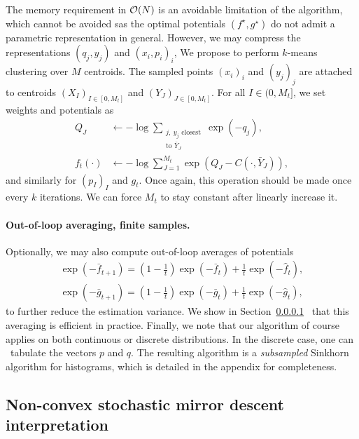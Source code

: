 The memory requirement in $\mathcal{O}(N)$ is an
avoidable limitation of the algorithm, which cannot be avoided sas the optimal
potentials $(f^\star, g^\star)$ do not admit a parametric representation in
general. However, we may compress the representations $(q_j, y_j)$ and $(x_i,
p_i)_i$, We propose to perform $k$-means clustering over $M$ centroids. The
sampled points $(x_i)_i$ and $(y_j)_j$ are attached to centroids ${(X_I)}_{I \in
[0,M_t]}$ and ${(Y_J)}_{J \in [0,M_t]}$. For all $I \in (0, M_t]$, we set
weights and potentials as
\begin{align}
    Q_J &\gets - \log \sum_{\substack{j,\:y_j \text{ closest}\\\text{to } \bar Y_J}}
     \exp(-q_j),\\
    f_t(\cdot) &\gets - \log\sum_{J=1}^{M_t} \exp(Q_J - C(\cdot, \bar Y_J)),
\end{align}
and similarly for $(p_I)_I$ and $g_t$. Once again, this operation should be made
once every $k$ iterations. We can force $M_t$ to stay constant after linearly increase it.

\paragraph{Out-of-loop averaging, finite samples.} Optionally, we may also
compute out-of-loop averages of potentials
\begin{align}
    \exp(-\bar f_{t+1}) = (1 - \frac{1}{t}) \exp(-\bar f_t) + \frac{1}{t} \exp(-\hat f_t), \\
    \exp(-\bar g_{t+1}) = (1 - \frac{1}{t}) \exp(-\bar g_t) + \frac{1}{t} \exp(-\hat g_t),
\end{align}
to further reduce the estimation variance. We show in Section~\ref{}  that this averaging is
efficient in practice. Finally, we note that our algorithm of course applies on both continuous or discrete distributions. In the discrete case, one can  tabulate the vectors $p$ and $q$. The resulting
algorithm is a \textit{subsampled} Sinkhorn algorithm for histograms, which is detailed in the appendix for completeness.


\subsection{Non-convex stochastic mirror descent interpretation}
\label{sec-mirror}

